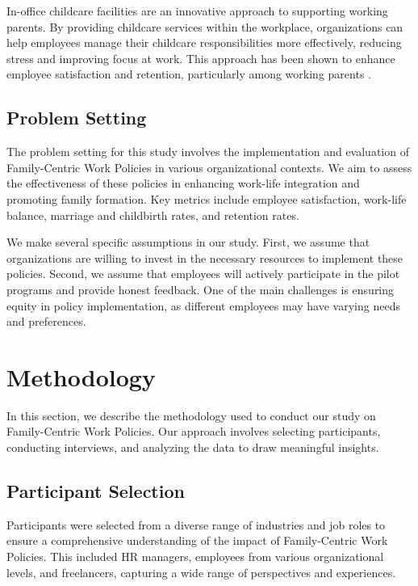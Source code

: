 \documentclass{article} %
\begin{document}
In-office childcare facilities are an innovative approach to supporting working parents. By providing childcare services within the workplace, organizations can help employees manage their childcare responsibilities more effectively, reducing stress and improving focus at work. This approach has been shown to enhance employee satisfaction and retention, particularly among working parents \cite{zhou2023peer}.

\subsection{Problem Setting}

The problem setting for this study involves the implementation and evaluation of Family-Centric Work Policies in various organizational contexts. We aim to assess the effectiveness of these policies in enhancing work-life integration and promoting family formation. Key metrics include employee satisfaction, work-life balance, marriage and childbirth rates, and retention rates.

We make several specific assumptions in our study. First, we assume that organizations are willing to invest in the necessary resources to implement these policies. Second, we assume that employees will actively participate in the pilot programs and provide honest feedback. One of the main challenges is ensuring equity in policy implementation, as different employees may have varying needs and preferences.

\section{Methodology}
\label{sec:method}

In this section, we describe the methodology used to conduct our study on Family-Centric Work Policies. Our approach involves selecting participants, conducting interviews, and analyzing the data to draw meaningful insights.

\subsection{Participant Selection}

Participants were selected from a diverse range of industries and job roles to ensure a comprehensive understanding of the impact of Family-Centric Work Policies. This included HR managers, employees from various organizational levels, and freelancers, capturing a wide range of perspectives and experiences.
\end{document}
